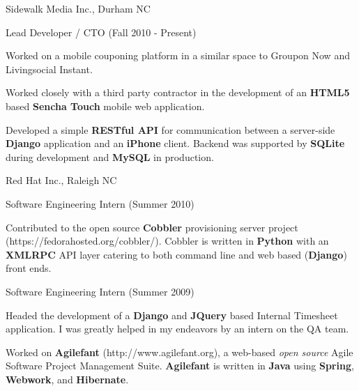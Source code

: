 \documentclass[11pt]{article}
\begin{document}
        \begin{itemz}
            \item Sidewalk Media Inc., Durham NC
                \begin{itemz}[-]
                    \item Lead Developer / CTO (Fall 2010 - Present)
                        \begin{itemz}[*]
                            \item Worked on a mobile couponing platform in a similar space to Groupon Now and Livingsocial Instant.
                            \item Worked closely with a third party contractor in the development of an {\bf HTML5} based {\bf Sencha Touch} mobile web application.
                            \item Developed a simple {\bf RESTful API} for communication between a server-side {\bf Django} application and an {\bf iPhone} client. Backend was supported by {\bf SQLite} during development and {\bf MySQL} in production.
                        \end{itemz}
                \end{itemz}
            \item Red Hat Inc., Raleigh NC
                \begin{itemz}[-]
                    \item Software Engineering Intern (Summer 2010)
                        \begin{itemz}[*]
                            \item Contributed to the open source {\bf Cobbler} provisioning server project \\
                            (https://fedorahosted.org/cobbler/).  Cobbler is written in {\bf Python} with an {\bf XMLRPC} API layer catering to both command line and web based ({\bf Django}) front ends.
                        \end{itemz}
                    \item Software Engineering Intern (Summer 2009)
                        \begin{itemz}[*]
                            \item Headed the development of a {\bf Django} and {\bf JQuery} based Internal Timesheet application.  I was greatly helped in my endeavors by an intern on the QA team.
                            \item Worked on {\bf Agilefant} (http://www.agilefant.org), a web-based \emph{open source} Agile Software Project Management Suite. {\bf Agilefant} is written in {\bf Java} using {\bf Spring}, {\bf Webwork}, and {\bf Hibernate}.

\end{itemz}
\end{itemz}
\end{itemz}
\end{document}
